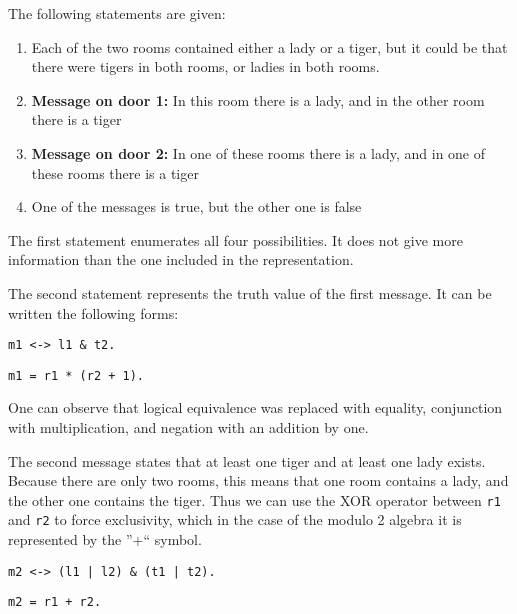The following statements are given:

\begin{enumerate}

\item Each of the two rooms contained either a lady or a tiger, but it could be that there were tigers in both rooms, or ladies in both rooms.

\item \textbf{Message on door 1:} In this room there is a lady, and in the other room there is a tiger

\item \textbf{Message on door 2:} In one of these rooms there is a lady, and in one of these rooms there is a tiger

\item One of the messages is true, but the other one is false

\end{enumerate}

The first statement enumerates all four possibilities. It does not give more information than the one included in the representation.

The second statement represents the truth value of the first message. It can be written the following forms:

\begin{multicols}{2}

\begin{lstlisting}[numbers=none,title=Propositional logic]
m1 <-> l1 & t2.
\end{lstlisting}

\begin{lstlisting}[numbers=none,title=Modular arithmetics]
m1 = r1 * (r2 + 1).
\end{lstlisting}

\end{multicols}

One can observe that logical equivalence was replaced with equality, conjunction with multiplication, and negation with an addition by one.

The second message states that at least one tiger and at least one lady exists. Because there are only two rooms, this means that one room contains a lady, and the other one contains the tiger. Thus we can use the XOR operator between \verb|r1| and \verb|r2| to force exclusivity, which in the case of the modulo 2 algebra it is represented by the ''+`` symbol.

\begin{multicols}{2}

\begin{lstlisting}[numbers=none,title=Propositional logic]
m2 <-> (l1 | l2) & (t1 | t2).
\end{lstlisting}

\begin{lstlisting}[numbers=none,title=Modular arithmetics]
m2 = r1 + r2.
\end{lstlisting}

\end{multicols}

